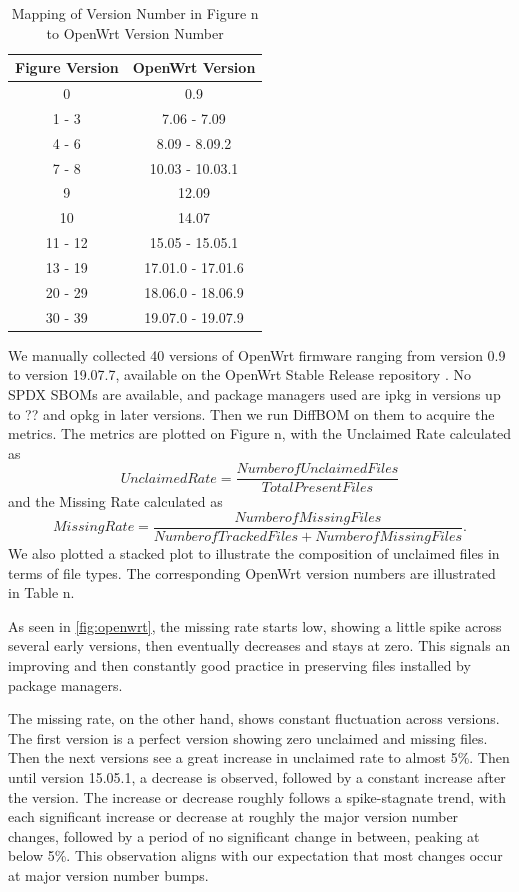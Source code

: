 \begin{table}[h!]
	\centering
	\begin{tabular}{|c|c|}
		\hline
		Figure Version & OpenWrt Version \\
		\hline
		0 & 0.9 \\
		1 - 3 & 7.06 - 7.09 \\
		4 - 6 & 8.09 - 8.09.2 \\
		7 - 8 & 10.03 - 10.03.1 \\
		9 & 12.09 \\
		10 & 14.07 \\
		11 - 12 & 15.05 - 15.05.1 \\
		13 - 19 & 17.01.0 - 17.01.6 \\
		20 - 29 & 18.06.0 - 18.06.9 \\
		30 - 39 & 19.07.0 - 19.07.9 \\
		\hline
	\end{tabular}
	\caption{Mapping of Version Number in Figure n to OpenWrt Version Number}
	\label{table:openwrt}
\end{table}
We manually collected 40 versions of OpenWrt firmware ranging from version 0.9 to version 19.07.7, available on the OpenWrt Stable Release repository \cite{OpenWrt_Vers}. No SPDX SBOMs are available, and package managers used are ipkg in versions up to ?? and opkg in later versions. Then we run DiffBOM on them to acquire the metrics. The metrics are plotted on Figure n, with the Unclaimed Rate calculated as
\[Unclaimed Rate = \frac{Number of Unclaimed Files}{Total Present Files}\]
and the Missing Rate calculated as
\[Missing Rate = \frac{Number of Missing Files}{Number of Tracked Files + Number of Missing Files}.\]
We also plotted a stacked plot to illustrate the composition of unclaimed files in terms of file types.
The corresponding OpenWrt version numbers are illustrated in Table n. \par
As seen in \ref{fig:openwrt}, the missing rate starts low, showing a little spike across several early versions, then eventually decreases and stays at zero. This signals an improving and then constantly good practice in preserving files installed by package managers. \par
The missing rate, on the other hand, shows constant fluctuation across versions. The first version is a perfect version showing zero unclaimed and missing files. Then the next versions see a great increase in unclaimed rate to almost 5\%. Then until version 15.05.1, a decrease is observed, followed by a constant increase after the version. The increase or decrease roughly follows a spike-stagnate trend, with each significant increase or decrease at roughly the major version number changes, followed by a period of no significant change in between, peaking at below 5\%. This observation aligns with our expectation that most changes occur at major version number bumps. \par
